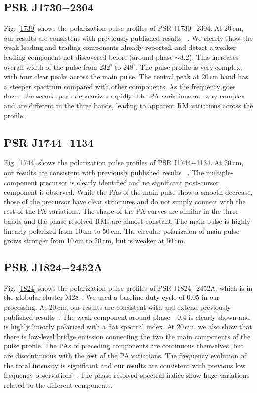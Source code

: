 \documentclass[useAMS,usenatbib]{mn2e}
\begin{document}
\begin{appendix}
\subsection{PSR J1730$-$2304}

Fig. \ref{1730} shows the polarization pulse profiles of 
PSR J1730$-$2304.
%
At 20\,cm, our results are consistent with previously published results
~\citep{Ord04,Yan11}. 
%
We clearly show the weak leading and trailing components already reported, 
and detect a weaker leading component not discovered before (around phase $\sim3.2$). 
This increases overall width of the pulse from $232^{\circ}$ to $248^{\circ}$.
%
The pulse profile is very complex, with four clear peaks across the main pulse.
%
The central peak at 20\,cm band has a steeper spactrum compared with other 
components.
%
As the frequency goes down, the second peak depolarizes rapidly.
%
The PA variations are very complex and are different in the three bands, 
leading to apparent RM variations across the profile.

\subsection{PSR J1744$-$1134}

Fig. \ref{1744} shows the polarization pulse profiles of 
PSR J1744$-$1134.
%
At 20\,cm, our results are consistent with previously published results
~\citep{Yan11}.
%
The multiple-component precursor is clearly identified and no significant 
post-cursor component is observed.
%
While the PAs of the main pulse show a smooth decrease, those of the precursor 
have clear structures and do not simply connect with the rest of the PA 
variations.
%
The shape of the PA curves are similar in the three bands and the phase-resolved 
RMs are almost constant.
%
The main pulse is highly linearly polarized from 10\,cm to 50\,cm. 
The circular polarizaion of main pulse grows stronger from 10\,cm to 20\,cm, 
but is weaker at 50\,cm.

\subsection{PSR J1824$-$2452A}

Fig. \ref{1824} shows the polarization pulse profiles of 
PSR J1824$-$2452A, which is in the globular cluster M28~\citep{Lyne87}.
%
We used a baseline duty cycle of 0.05 in our processing.
%
At 20\,cm, our results are consistent with and extend previously published 
results~\citep{Ord04,Yan11}.
%
The weak component around phase $-0.4$ is clearly shown and is highly 
linearly polarized with a flat spectral index. 
%
At 20\,cm, we also show that there is low-level bridge emission 
connecting the two the main components of the pulse profile.
%
The PAs of preceding components are continuous themselves, but are 
discontinuous with the rest of the PA variations.
%
The frequency evolution of the total intensity is significant and 
our results are consistent with previous low frequency observations~\citep[e.g.,][]{Stairs99}.
The phase-resolved spectral indice show huge variations related to the 
different components. 
%


\end{appendix}
\end{document}
